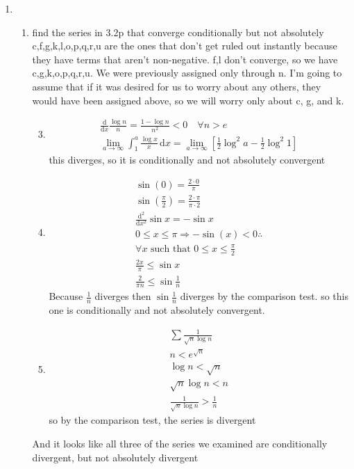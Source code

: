 \documentclass[letterpaper]{article}
\begin{document}
\begin{enumerate}
\begin{enumerate}
  \end{enumerate}
\item
\begin{enumerate}
\item
  find the series in 3.2p that converge conditionally but not absolutely
  c,f,g,k,l,o,p,q,r,u are the ones that don't get ruled out instantly because they have terms that aren't non-negative. f,l don't converge, so we have c,g,k,o,p,q,r,u. We were previously assigned only through n. I'm going to assume that if it was desired for us to worry about any others, they would have been assigned above, so we will worry only about c, g, and k.
  \begin{enumerate}
  \setcounter{enumiii}{2}
  \item
  \begin{align*}
    \frac{\mathrm{d}}{\mathrm{d}x}\frac{\log n}{n}=\frac{1-\log n}{n^2}<0 \quad\forall n>e\\
    \lim_{a\to\infty}\int_1^a{\frac{\log x}{x}\,\mathrm{d}x}=\lim_{a\to\infty}\left[\frac{1}{2}\log^2a-\frac{1}{2}\log^2 1\right]
  \end{align*}
  this diverges, so it is conditionally and not absolutely convergent
  \setcounter{enumiii}{6}
  \item
  \begin{align*}
    \sin(0)=\frac{2\cdot0}{\pi}\\
    \sin(\frac{\pi}{2})=\frac{2\cdot\pi}{\pi\cdot 2}\\
    \frac{\mathrm{d}^2}{\mathrm{d}x^2}\sin x =-\sin x\\
    0\le x\le \pi\Rightarrow-\sin(x)<0\therefore\\
    \forall x\text{ such that }0\le x\le \frac{\pi}{2}\\
    \frac{2x}{\pi}\le\sin x\\
    \frac{2}{\pi n}\le\sin\frac{1}{n}
  \end{align*}
  Because $\frac{1}{n}$ diverges then $\sin\frac{1}{n}$ diverges by the comparison test. so this one is conditionally and not absolutely convergent.
  \setcounter{enumiii}{10}
  \item
    \begin{align*}
      \sum\limits{\frac{1}{\sqrt{n}\log n}}\\
      n<e^{\sqrt{n}}\\
      \log n<\sqrt{n}\\
      \sqrt{n}\log n<n\\
      \frac{1}{\sqrt{n}\log n}>\frac{1}{n}
    \end{align*}
    so by the comparison test, the series is divergent
  \end{enumerate}
  And it looks like all three of the series we examined are conditionally divergent, but not absolutely divergent
\end{enumerate}
\end{enumerate}
\end{document}
